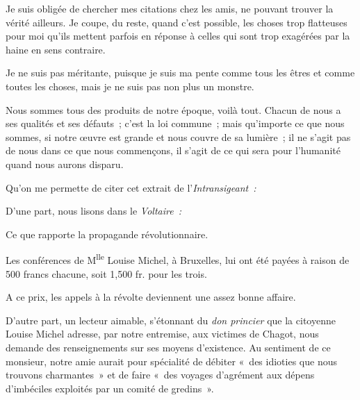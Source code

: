 \documentclass[french,twoside]{book} %
\newcommand{\astertri}{\medskip\par\centerline{\color{rubric}\large\selectfont{\syms ✻\,✻\,✻}}\medskip\par}%
\begin{document}
\noindent Je suis obligée de chercher mes citations chez les amis, ne pouvant trouver la vérité ailleurs. Je coupe, du reste, quand c’est possible, les choses trop flatteuses pour moi qu’ils mettent parfois en réponse à celles qui sont trop exagérées par la haine en sens contraire.\par
Je ne suis pas méritante, puisque je suis ma pente comme tous les êtres et comme toutes les choses, mais je ne suis pas non plus un monstre.\par
Nous sommes tous des produits de notre époque, voilà tout. Chacun de nous a ses qualités et ses défauts ; c’est la loi commune ; mais qu’importe ce que nous sommes, si notre œuvre est grande et nous couvre de sa lumière ; il ne s’agit pas de nous dans ce que nous commençons, il s’agit de ce qui sera pour l’humanité quand nous aurons disparu.\par
Qu’on me permette de citer cet extrait de l’\emph{Intransigeant :}\par
 D’une part, nous lisons dans le \emph{Voltaire :}\par
\bigbreak
\noindent Ce que rapporte la propagande révolutionnaire.\par
Les conférences de M\textsuperscript{lle} Louise Michel, à Bruxelles, lui ont été payées à raison de 500 francs chacune, soit 1,500 fr. pour les trois.\par
A ce prix, les appels à la révolte deviennent une assez bonne affaire.\par
\bigbreak
\noindent D’autre part, un lecteur aimable, s’étonnant du \emph{don princier} que la citoyenne Louise Michel adresse, par notre entremise, aux victimes de Chagot, nous demande des renseignements sur ses moyens d’existence. Au sentiment de ce monsieur, notre amie aurait pour spécialité de débiter « des idioties que nous trouvons charmantes » et de faire « des voyages d’agrément aux dépens d’imbéciles exploités par un comité de gredins ».\par

\astertri
\end{document}
